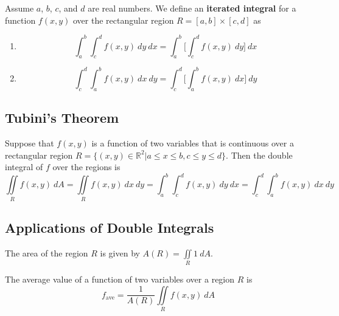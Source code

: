 \documentclass{article}
\begin{document}
Assume $a$, $b$, $c$, and $d$ are real numbers. We define an \textbf{iterated integral} for a function $f(x,y)$ over the rectangular region $R=[a,b]\times [c,d]$ as
\begin{enumerate}
    \item \[\int_a^b\int_c^d f(x,y)\: dy\: dx=\int_a^b\Bigg[\int_c^d f(x,y)\: dy\Bigg]\: dx\]
    \item \[\int_c^d\int_a^b f(x,y)\: dx\: dy=\int_c^d\Bigg[\int_a^b f(x,y)\: dx\Bigg]\: dy\]
\end{enumerate}

\subsection*{Tubini's Theorem}

Suppose that $f(x,y)$ is a function of two variables that is continuous over a rectangular region $R=\{(x,y)\in\mathbb{R}^2 | a\leq x\leq b,c\leq y\leq d\}$. Then the double integral of $f$ over the regions is
\[\iint\limits_R f(x,y)\: dA=\iint\limits_R f(x,y)\: dx\: dy=\int_a^b\int_c^d f(x,y)\: dy\: dx=\int_c^d\int_a^b f(x,y)\: dx\: dy\]

\subsection*{Applications of Double Integrals}

The area of the region $R$ is given by $A(R)=\iint\limits_R 1\: dA$.
\vspace{1em}

The average value of a function of two variables over a region $R$ is
\[f_\text{ave}=\frac{1}{A(R)}\iint\limits_R f(x,y)\: dA\]
\end{document}
